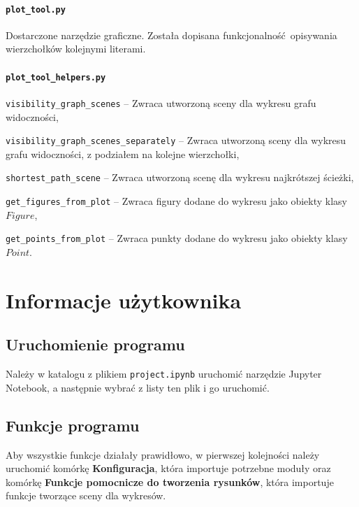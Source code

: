 \documentclass[12pt]{article}
\let\tempone\itemize
\let\temptwo\enditemize
\renewenvironment{itemize}{\tempone\setlength{\itemsep}{0cm}}{\temptwo}
\begin{document}
	\paragraph{\lstinline|plot_tool.py|}
		Dostarczone narzędzie graficzne. Została dopisana funkcjonalność opisywania wierzchołków kolejnymi literami.
	
	\paragraph{\lstinline|plot_tool_helpers.py|}
		\begin{itemize}
			\item \lstinline|visibility_graph_scenes| -- Zwraca utworzoną sceny dla wykresu grafu widoczności,
			\item \lstinline|visibility_graph_scenes_separately| -- Zwraca utworzoną sceny dla wykresu grafu widoczności, z podziałem na kolejne wierzchołki,
			\item \lstinline|shortest_path_scene| -- Zwraca utworzoną scenę dla wykresu najkrótszej ścieżki,
			\item \lstinline|get_figures_from_plot| -- Zwraca figury dodane do wykresu jako obiekty klasy $ Figure $,
			\item \lstinline|get_points_from_plot| -- Zwraca punkty dodane do wykresu jako obiekty klasy $ Point $.
		\end{itemize}

	\section{Informacje użytkownika}
	
		\subsection{Uruchomienie programu}
			Należy w katalogu z plikiem \lstinline|project.ipynb| uruchomić narzędzie Jupyter Notebook, a następnie wybrać z listy ten plik i go uruchomić.
	
		\subsection{Funkcje programu}
			Aby wszystkie funkcje działały prawidłowo, w pierwszej kolejności należy uruchomić komórkę \textbf{Konfiguracja}, która importuje potrzebne moduły oraz komórkę \textbf{Funkcje pomocnicze do tworzenia rysunków}, która importuje funkcje tworzące sceny dla wykresów.
		
\end{document}
